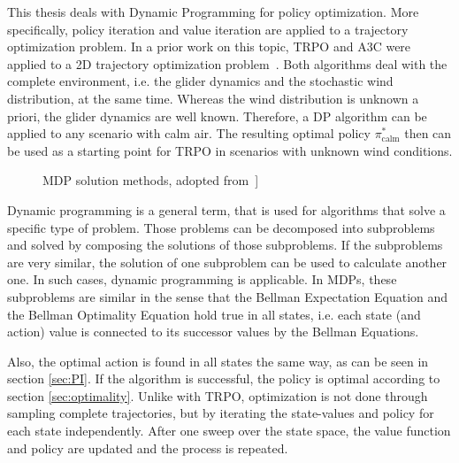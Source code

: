 This thesis deals with Dynamic Programming for policy optimization. More specifically, policy iteration and value iteration are applied to a trajectory optimization problem. In a prior work on this topic, TRPO and A3C were applied to a 2D trajectory optimization problem~\cite{Zuern2017}. Both algorithms deal with the complete environment, i.e. the glider dynamics and the stochastic wind distribution, at the same time. Whereas the wind distribution is unknown a priori, the glider dynamics are well known. Therefore, a DP algorithm can be applied to any scenario with calm air. The resulting optimal policy $\pi^*_{\text{calm}}$ then can be used as a starting point for TRPO in scenarios with unknown wind conditions.
\begin{figure}[h]
	\centering
	\caption{MDP solution methods, adopted from~\cite{Schulman2016}]}
	\label{fig:RLmethods} 
\end{figure}

Dynamic programming is a general term, that is used for algorithms that solve a specific type of problem. Those problems can be decomposed into subproblems and solved by composing the solutions of those subproblems. If the subproblems are very similar, the solution of one subproblem can be used to calculate another one. In such cases, dynamic programming is applicable. In MDPs, these subproblems are similar in the sense that the Bellman Expectation Equation and the Bellman Optimality Equation hold true in all states, i.e. each state (and action) value is connected to its successor values by the Bellman Equations.

Also, the optimal action is found in all states the same way, as can be seen in section \ref{sec:PI}. If the algorithm is successful, the policy is optimal according to section \ref{sec:optimality}. Unlike with TRPO, optimization is not done through sampling complete trajectories, but by iterating the state-values and policy for each state independently. After one sweep over the state space, the value function and policy are updated and the process is repeated.\smallbreak

